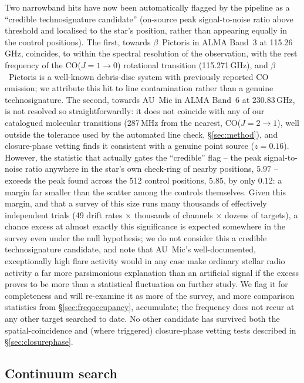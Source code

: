 \documentclass{openjournal}
\begin{document}
Two narrowband hits have now been automatically flagged by the pipeline
as a ``credible technosignature candidate'' (on-source peak
signal-to-noise ratio above threshold and localised to the star's
position, rather than appearing equally in the control positions). The
first, towards $\beta$~Pictoris in ALMA Band~3 at 115.26\,GHz, coincides,
to within the spectral resolution of the observation, with the rest
frequency of the CO($J=1\to0$) rotational transition (115.271\,GHz), and
$\beta$~Pictoris is a well-known debris-disc system with previously
reported CO emission; we attribute this hit to line contamination rather
than a genuine technosignature. The second, towards AU~Mic in ALMA
Band~6 at 230.83\,GHz, is not resolved so straightforwardly: it does not
coincide with any of our catalogued molecular transitions (287\,MHz from
the nearest, CO($J=2\to1$), well outside the tolerance used by the
automated line check, \S\ref{sec:method}), and closure-phase vetting
finds it consistent with a genuine point source ($z=0.16$). However, the
statistic that actually gates the ``credible'' flag -- the peak
signal-to-noise ratio anywhere in the star's own check-ring of nearby
positions, $5.97$ -- exceeds the peak found across the 512 control
positions, $5.85$, by only $0.12$: a margin far smaller than the
scatter among the controls themselves. Given this margin, and that a
survey of this size runs many thousands of effectively independent
trials (49 drift rates $\times$ thousands of channels $\times$ dozens of
targets), a chance excess at almost exactly this significance is
expected somewhere in the survey even under the null hypothesis; we do
not consider this a credible technosignature candidate, and note that
AU~Mic's well-documented, exceptionally high flare activity would in any
case make ordinary stellar radio activity a far more parsimonious
explanation than an artificial signal if the excess proves to be more
than a statistical fluctuation on further study. We flag it for
completeness and will re-examine it as more of the survey, and more
comparison statistics from \S\ref{sec:freqoccupancy}, accumulate; the
frequency does not recur at any other target searched to date. No other
candidate has survived both the spatial-coincidence and (where
triggered) closure-phase vetting tests described in
\S\ref{sec:closurephase}.

\subsection{Continuum search}
\end{document}
